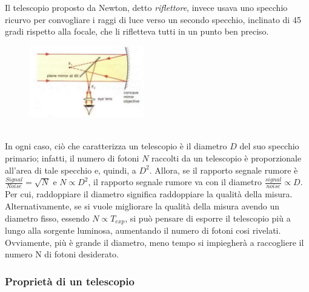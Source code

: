 \documentclass[a4paper,11pt]{article}
\begin{document}
Il telescopio proposto da Newton, detto \textit{riflettore}, invece usava uno specchio ricurvo per convogliare i raggi di luce verso un secondo specchio, inclinato di 45 gradi rispetto alla focale, che li rifletteva tutti in un punto ben preciso.
\begin{figure}[h!!]
    \centering
    \includegraphics[width=5cm]{WhatsApp Image 2023-01-09 at 02.44.03.jpeg}
    \label{fig:my_label5}
\end{figure}\\
In ogni caso, ciò che  caratterizza un telescopio è il diametro \(D\) del suo  specchio primario; infatti, il numero di fotoni \(N\) raccolti da un telescopio è proporzionale all'area di tale specchio e, quindi, a \(D^2\). Allora, se il rapporto segnale rumore è \(\frac{Signal}{Noise} = \sqrt{N}\) e \(N \propto D^2\), il rapporto segnale rumore va con il diametro \(\frac{signal}{noise} \propto D\). Per cui, raddoppiare il diametro significa raddoppiare la qualità della misura. 
Alternativamente, se si vuole migliorare la qualità della misura avendo un diametro fisso, essendo \(N \propto T_{exp}\), si può pensare di esporre il telescopio più a lungo alla sorgente luminosa, aumentando il numero di fotoni cosi rivelati. Ovviamente, più è grande il diametro, meno tempo si impiegherà a raccogliere il numero N di fotoni desiderato. 
\newpage

\subsubsection{Proprietà di un telescopio}
\end{document}
